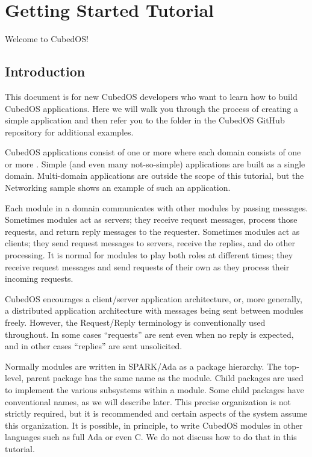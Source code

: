 
\section{Getting Started Tutorial}
\label{sec:getting-started}

Welcome to CubedOS!

\subsection{Introduction}

This document is for new CubedOS developers who want to learn how to build CubedOS applications.
Here we will walk you through the process of creating a simple application and then refer you to
the  folder in the CubedOS GitHub repository for additional examples.

CubedOS applications consist of one or more  where each domain consists of one
or more . Simple (and even many not-so-simple) applications are built as a
single domain. Multi-domain applications are outside the scope of this tutorial, but the
Networking sample shows an example of such an application.

Each module in a domain communicates with other modules by passing messages. Sometimes modules
act as servers; they receive request messages, process those requests, and return reply messages
to the requester. Sometimes modules act as clients; they send request messages to servers,
receive the replies, and do other processing. It is normal for modules to play both roles at
different times; they receive request messages and send requests of their own as they process
their incoming requests.

CubedOS encourages a client/server application architecture, or, more generally, a distributed
application architecture with messages being sent between modules freely. However, the
Request/Reply terminology is conventionally used throughout. In some cases ``requests'' are sent
even when no reply is expected, and in other cases ``replies'' are sent unsolicited.

Normally modules are written in SPARK/Ada as a package hierarchy. The top-level, parent package
has the same name as the module. Child packages are used to implement the various subsystems
within a module. Some child packages have conventional names, as we will describe later. This
precise organization is not strictly required, but it is recommended and certain aspects of the
system assume this organization. It is possible, in principle, to write CubedOS modules in other
languages such as full Ada or even C. We do not discuss how to do that in this tutorial.

